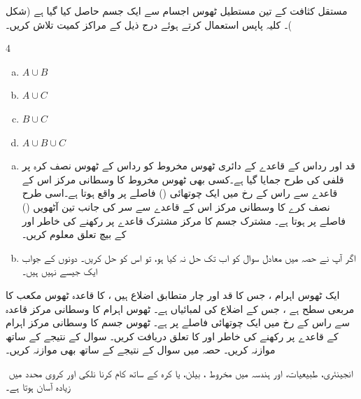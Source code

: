مستقل کثافت  کے تین مستطیل ٹھوس اجسام سے ایک جسم حاصل کیا گیا ہے (شکل )۔ کلیہ پاپس استعمال کرتے ہوئے درج  ذیل کے مراکز کمیت تلاش کریں۔
\begin{multicols}{4}
\begin{enumerate}[a.]
\item
$A\cup B$
\item
$A\cup C$
\item
$B\cup C$
\item
$A\cup B\cup C$
\end{enumerate}
\end{multicols}
\begin{enumerate}[a.]
\item
 قد  اور رداس  کے قاعدے کے دائری ٹھوس  مخروط  کو رداس  کے    ٹھوس  نصف کرہ   پر قلفی کی طرح جمایا گیا ہے۔کسی بھی ٹھوس مخروط کا وسطانی مرکز  اس کے قاعدے  سے راس کے رخ میں   ایک   چوتھائی ()  فاصلے  پر واقع  ہوتا ہے۔اسی طرح  نصف کرے  کا وسطانی مرکز  اس کے قاعدے سے سر  کی جانب   تین آٹھویں ()  فاصلے پر ہوتا   ہے۔ مشترک جسم  کا مرکز مشترک قاعدے پر رکھنے کی خاطر  اور  کے بیچ تعلق معلوم کریں۔ 
\item
اگر آپ نے حصہ  میں معادل    سوال  کو اب تک حل نہ کیا ہو، تو اس کو حل کریں۔ دونوں کے جواب ایک  جیسے نہیں ہیں۔
\end{enumerate}
ایک ٹھوس اہرام    ، جس کا  قد    اور  چار متطابق  اضلاع ہیں ، کا قاعدہ ٹھوس    مکعب    کا   مربعی  سطح ہے ، جس کے اضلاع کی  لمبائیاں  ہے۔  ٹھوس اہرام کا وسطانی مرکز قاعدہ سے راس کے رخ میں  ایک چوتھائی فاصلے پر ہے۔ ٹھوس جسم  کا وسطانی مرکز اہرام کے قاعدے  پر رکھنے کی خاطر  اور  کا تعلق دریافت کریں۔ سوال  کے نتیجے کے ساتھ موازنہ کریں۔ حصہ  میں سوال  کے نتیجے کے ساتھ بھی موازنہ کریں۔


﻿
انجینئری،  طبیعیات،  اور ہندسہ میں  مخروط ، بیلن،  یا کرہ کے ساتھ کام   کرنا نلکی اور کروی محدد میں زیادہ آسان ہوتا ہے۔


